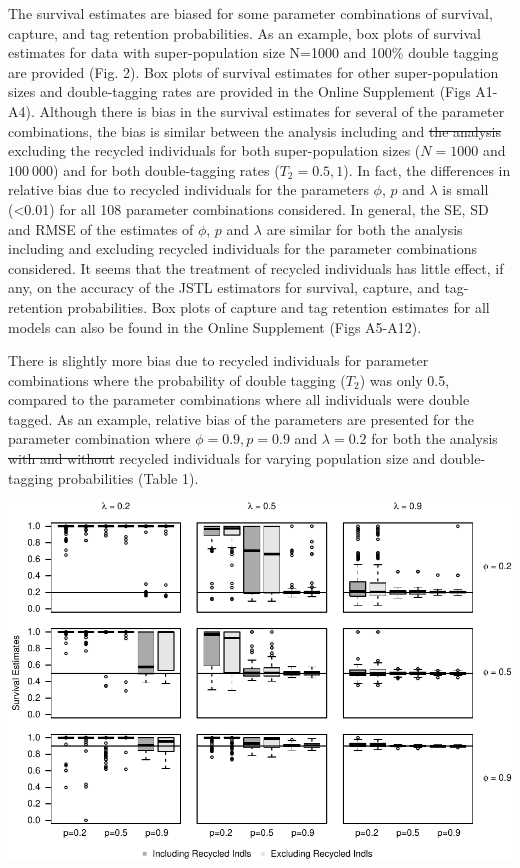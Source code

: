 \documentclass[12pt]{article}
\providecommand{\DIFaddtex}[1]{{\protect\color{blue}\uwave{#1}}} %
\providecommand{\DIFdeltex}[1]{{\protect\color{red}\sout{#1}}}                      %
\providecommand{\DIFaddbegin}{} %
\providecommand{\DIFaddend}{} %
\providecommand{\DIFdelbegin}{} %
\providecommand{\DIFdelend}{} %
\providecommand{\DIFadd}[1]{\texorpdfstring{\DIFaddtex{#1}}{#1}} %
\providecommand{\DIFdel}[1]{\texorpdfstring{\DIFdeltex{#1}}{}} %
\newcommand{\DIFscaledelfig}{0.5}
\newlength{\DIFdelgraphicswidth} %
\newlength{\DIFdelgraphicsheight} %
\newcommand{\DIFaddincludegraphics}[2][]{{\color{blue}\fbox{\DIFOincludegraphics[#1]{#2}}}} %
\newcommand{\DIFdelincludegraphics}[2][]{%
\sbox{\DIFdelgraphicsbox}{\DIFOincludegraphics[#1]{#2}}%
\settoboxwidth{\DIFdelgraphicswidth}{\DIFdelgraphicsbox} %
\settoboxtotalheight{\DIFdelgraphicsheight}{\DIFdelgraphicsbox} %
\scalebox{\DIFscaledelfig}{%
\parbox[b]{\DIFdelgraphicswidth}{\usebox{\DIFdelgraphicsbox}\\[-\baselineskip] \rule{\DIFdelgraphicswidth}{0em}}\llap{\resizebox{\DIFdelgraphicswidth}{\DIFdelgraphicsheight}{%
\setlength{\unitlength}{\DIFdelgraphicswidth}%
\begin{picture}(1,1)%
\thicklines\linethickness{2pt} %
{\color[rgb]{1,0,0}\put(0,0){\framebox(1,1){}}}%
{\color[rgb]{1,0,0}\put(0,0){\line( 1,1){1}}}%
{\color[rgb]{1,0,0}\put(0,1){\line(1,-1){1}}}%
\end{picture}%
}\hspace*{3pt}}} %
} %
\DeclareRobustCommand{\DIFaddbegin}{\DIFOaddbegin \let\includegraphics\DIFaddincludegraphics} %
\DeclareRobustCommand{\DIFaddend}{\DIFOaddend \let\includegraphics\DIFOincludegraphics} %
\DeclareRobustCommand{\DIFdelbegin}{\DIFOdelbegin \let\includegraphics\DIFdelincludegraphics} %
\DeclareRobustCommand{\DIFdelend}{\DIFOaddend \let\includegraphics\DIFOincludegraphics} %
\begin{document}
The survival estimates are biased for some
parameter combinations of survival, capture, and tag retention
probabilities. As an example, box plots of survival estimates for data
with super-population size N=1000 and 100\% double tagging are provided
(Fig. 2). Box plots of survival estimates for other super-population
sizes and double-tagging rates are provided in the Online Supplement (Figs
A1-A4). Although there is bias in the survival estimates for several of
the parameter combinations, the bias is similar between the analysis
including and \DIFdelbegin \DIFdel{the analysis }\DIFdelend excluding the recycled individuals for both
super-population sizes (\(N=1000\) and \(100\ 000\)) and for both
double-tagging rates (\(T_2=0.5,1\)). In fact, the differences in
relative bias due to recycled individuals for the parameters \(\phi\),
\(p\) and \(\lambda\) is small (\textless{}0.01) for all 108 parameter
combinations considered. In general, the SE, SD and RMSE of the
estimates of \(\phi\), \(p\) and \(\lambda\) are similar for both the
analysis including and excluding recycled individuals for the parameter
combinations considered. It seems that the treatment of
recycled individuals has little effect, if any, on the accuracy of the
JSTL estimators for survival, capture, and tag-retention probabilities.
Box plots of capture and tag retention estimates for all models can also
be found in the Online Supplement (Figs A5-A12).

There is slightly more bias due to recycled individuals for parameter combinations 
where the probability of double tagging (\(T_2\)) was only 0.5, compared to the parameter combinations where all individuals were double tagged. As an example, relative bias of
the parameters are presented for the parameter combination where
\(\phi=0.9, p=0.9\) and \(\lambda=0.2\) for both the analysis \DIFdelbegin \DIFdel{with and
without }\DIFdelend \DIFaddbegin \DIFadd{including and
excluding }\DIFaddend recycled individuals for varying population size and
double-tagging probabilities (Table 1).

\includegraphics{RecycledPaper_files/figure-latex/Figure1_survival_GJSTL1-1.pdf}
\end{document}
